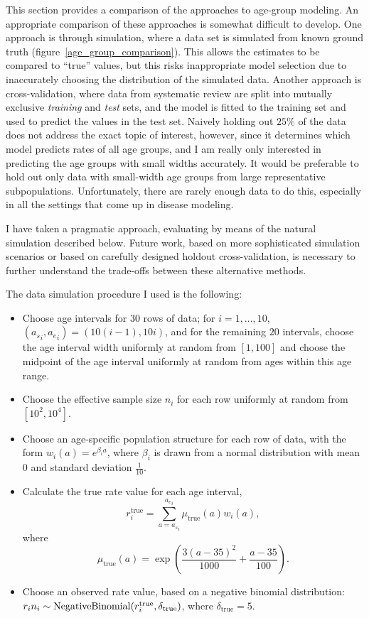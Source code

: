 This section provides a comparison of the approaches to age-group
modeling.  An appropriate comparison of these approaches is somewhat difficult to
develop.  One approach is through simulation, where a data set is
simulated from known ground truth (figure~\ref{age_group_comparison}).
This allows the estimates to be
compared to ``true'' values, but this risks
inappropriate model selection due to inaccurately choosing the
distribution of the simulated data.  Another approach is
cross-validation, where data from systematic review are split into
mutually exclusive
\emph{training} and \emph{test} sets, and the model is fitted to the
training set and used to predict the values in the test set.  Naively
holding out $25\%$ of the data does not address the exact topic of
interest, however, since it determines which model predicts rates of
all age groups, and I am really only interested in predicting the age groups
with small widths accurately.  It would be preferable to hold
out only data with small-width age groups from large representative
subpopulations.  Unfortunately, there are rarely enough data to do this,
especially in all the settings that come up in disease modeling.

I have taken a pragmatic approach, evaluating by means of the natural
simulation described below.  Future work, based on more sophisticated
simulation scenarios or based on carefully designed holdout
cross-validation, is necessary to further understand the trade-offs
between these alternative methods.

The data simulation procedure I used is the following:
\begin{itemize}
\item Choose age intervals for $30$ rows of data; for $i=1,\ldots,10$,
  $({a_s}_i,{a_e}_i) = (10(i-1), 10i)$, and for the remaining $20$
  intervals, choose the age interval width uniformly at random from $[1,100]$
  and choose the midpoint of the age interval uniformly at random from ages
  within this age range.

\item Choose the effective sample size $n_i$ for each row uniformly at random from $[10^2, 10^4]$.

\item Choose an age-specific population structure for each row of data,
  with the form $w_i(a) = e^{\beta_i a}$, where $\beta_i$ is drawn
  from a normal distribution with mean $0$ and standard deviation
  $\frac{1}{10}$.

\item Calculate the true rate value for each age interval,
  \[ r^\text{true}_i = \sum_{a={a_s}_i}^{{a_e}_i} \mu_\text{true}(a)
  w_i(a),\] where \[ \mu_\text{true}(a) =
  \exp\left(\frac{3(a-35)^2}{1000} + \frac{a-35}{100}\right). \]

\item Choose an observed rate value, based on a negative binomial distribution:
$r_in_i \sim \operatorname{NegativeBinomial}(r^\text{true}_i, \delta_\text{true})$, where $\delta_\text{true} = 5$.
\end{itemize}

